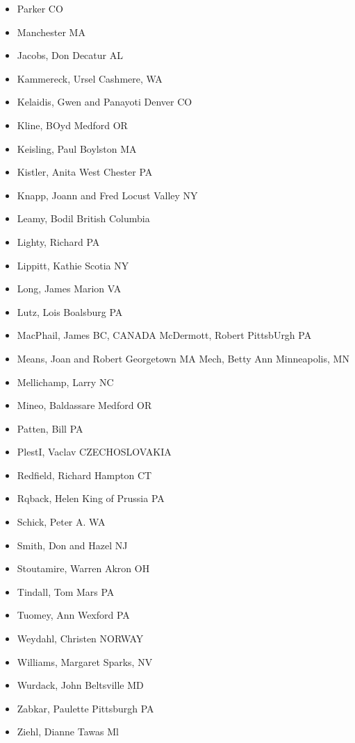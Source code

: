 \begin{itemize}
\item Parker CO
\item Manchester MA
\item Jacobs, Don Decatur AL
\item Kammereck, Ursel Cashmere, WA
\item Kelaidis, Gwen and Panayoti Denver CO
\item Kline, BOyd Medford OR
\item Keisling, Paul Boylston MA
\item Kistler, Anita West Chester PA
\item Knapp, Joann and Fred Locust Valley NY
\item Leamy, Bodil British Columbia
\item Lighty, Richard PA
\item Lippitt, Kathie Scotia NY
\item Long, James Marion VA
\item Lutz, Lois Boalsburg PA
\item MacPhail, James BC, CANADA McDermott, Robert PittsbUrgh PA
\item Means, Joan and Robert Georgetown MA Mech, Betty Ann Minneapolis, MN
\item Mellichamp, Larry NC
\item Mineo, Baldassare Medford OR
\item Patten, Bill PA
\item PlestI, Vaclav CZECHOSLOVAKIA
\item Redfield, Richard Hampton CT
\item Rqback, Helen King of Prussia PA
\item Schick, Peter A. WA
\item Smith, Don and Hazel NJ
\item Stoutamire, Warren Akron OH
\item Tindall, Tom Mars PA
\item Tuomey, Ann Wexford PA
\item Weydahl, Christen NORWAY
\item Williams, Margaret Sparks, NV
\item Wurdack, John Beltsville MD
\item Zabkar, Paulette Pittsburgh PA
\item Ziehl, Dianne Tawas Ml
\end{itemize}

